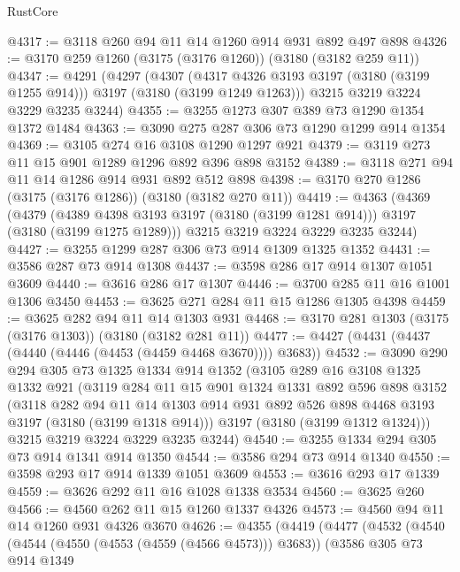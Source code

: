 \begin{lexlean}{RustCore}
\begin{coremodule}
@4317 := @3118 @260 @94 @11 @14 @1260 @914 @931 @892 @497 @898
@4326 := @3170 @259 @1260 (@3175 (@3176 @1260)) (@3180 (@3182 @259 @11))
@4347 := @4291
    (@4297
      (@4307 (@4317 @4326 @3193 @3197 (@3180 (@3199 @1255 @914))) @3197 (@3180 (@3199 @1249 @1263)))
      @3215
      @3219
      @3224
      @3229
      @3235
      @3244)
@4355 := @3255 @1273 @307 @389 @73 @1290 @1354 @1372 @1484
@4363 := @3090 @275 @287 @306 @73 @1290 @1299 @914 @1354
@4369 := @3105 @274 @16 @3108 @1290 @1297 @921
@4379 := @3119 @273 @11 @15 @901 @1289 @1296 @892 @396 @898 @3152
@4389 := @3118 @271 @94 @11 @14 @1286 @914 @931 @892 @512 @898
@4398 := @3170 @270 @1286 (@3175 (@3176 @1286)) (@3180 (@3182 @270 @11))
@4419 := @4363
    (@4369
      (@4379 (@4389 @4398 @3193 @3197 (@3180 (@3199 @1281 @914))) @3197 (@3180 (@3199 @1275 @1289)))
      @3215
      @3219
      @3224
      @3229
      @3235
      @3244)
@4427 := @3255 @1299 @287 @306 @73 @914 @1309 @1325 @1352
@4431 := @3586 @287 @73 @914 @1308
@4437 := @3598 @286 @17 @914 @1307 @1051 @3609
@4440 := @3616 @286 @17 @1307
@4446 := @3700 @285 @11 @16 @1001 @1306 @3450
@4453 := @3625 @271 @284 @11 @15 @1286 @1305 @4398
@4459 := @3625 @282 @94 @11 @14 @1303 @931
@4468 := @3170 @281 @1303 (@3175 (@3176 @1303)) (@3180 (@3182 @281 @11))
@4477 := @4427 (@4431 (@4437 (@4440 (@4446 (@4453 (@4459 @4468 @3670)))) @3683))
@4532 := @3090
    @290
    @294
    @305
    @73
    @1325
    @1334
    @914
    @1352
    (@3105
      @289
      @16
      @3108
      @1325
      @1332
      @921
      (@3119
        @284
        @11
        @15
        @901
        @1324
        @1331
        @892
        @596
        @898
        @3152
        (@3118
          @282
          @94
          @11
          @14
          @1303
          @914
          @931
          @892
          @526
          @898
          @4468
          @3193
          @3197
          (@3180 (@3199 @1318 @914)))
        @3197
        (@3180 (@3199 @1312 @1324)))
      @3215
      @3219
      @3224
      @3229
      @3235
      @3244)
@4540 := @3255 @1334 @294 @305 @73 @914 @1341 @914 @1350
@4544 := @3586 @294 @73 @914 @1340
@4550 := @3598 @293 @17 @914 @1339 @1051 @3609
@4553 := @3616 @293 @17 @1339
@4559 := @3626 @292 @11 @16 @1028 @1338 @3534
@4560 := @3625 @260
@4566 := @4560 @262 @11 @15 @1260 @1337 @4326
@4573 := @4560 @94 @11 @14 @1260 @931 @4326 @3670
@4626 := @4355
    (@4419
      (@4477
        (@4532
          (@4540
            (@4544 (@4550 (@4553 (@4559 (@4566 @4573))) @3683))
            (@3586
              @305
              @73
              @914
              @1349

\end{coremodule}
\end{lexlean}
